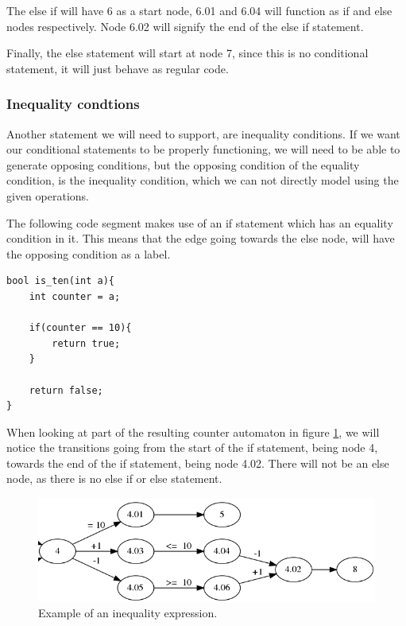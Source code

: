 \documentclass[12pt]{article}
\begin{document}
The else if will have 6 as a start node, 6.01 and 6.04 will function as if and else nodes respectively. Node 6.02 will signify the end of the else if statement.

Finally, the else statement will start at node 7, since this is no conditional statement, it will just behave as regular code.

\subsubsection{Inequality condtions}
Another statement we will need to support, are inequality conditions. If we want our conditional statements to be properly functioning, we will need to be able to generate opposing conditions, but the opposing condition of the equality condition, is the inequality condition, which we can not directly model using the given operations.

The following code segment makes use of an if statement which has an equality condition in it. This means that the edge going towards the else node, will have the opposing condition as a label.

\begin{lstlisting}[style=CStyle]
bool is_ten(int a){
	int counter = a;
	
	if(counter == 10){
		return true;
	}
	
	return false;
}
\end{lstlisting}

When looking at part of the resulting counter automaton in figure \ref{fig:inequality_expression}, we will notice the transitions going from the start of the if statement, being node 4, towards the end of the if statement, being node 4.02. There will not be an else node, as there is no else if or else statement.

\begin{figure}[h]
	\centering
	\includegraphics[width=\linewidth]{inequality_expression}
	\caption{Example of an inequality expression.}
	\label{fig:inequality_expression}
\end{figure}
\end{document}
